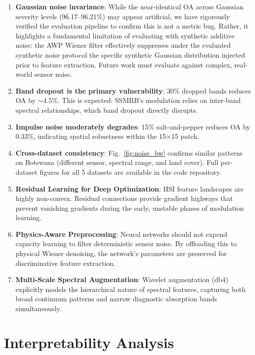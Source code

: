 \documentclass[conference]{IEEEtran}
\begin{document}
{{\begin{enumerate}
\item \textbf{Gaussian noise invariance}: While the near-identical OA across Gaussian severity levels (96.17--96.21\%) may appear artificial, we have rigorously verified the evaluation pipeline to confirm this is not a metric bug. Rather, it highlights a fundamental limitation of evaluating with synthetic additive noise: the AWP Wiener filter effectively suppresses under the evaluated synthetic noise protocol the specific synthetic Gaussian distribution injected prior to feature extraction. Future work must evaluate against complex, real-world sensor noise.
\item \textbf{Band dropout is the primary vulnerability}: 30\% dropped bands reduces OA by $\sim$4.5\%. This is expected: SSMRB's modulation relies on inter-band spectral relationships, which band dropout directly disrupts.
\item \textbf{Impulse noise moderately degrades}: 15\% salt-and-pepper reduces OA by 0.33\%, indicating spatial robustness within the 15$\times$15 patch.
\item \textbf{Cross-dataset consistency}: Fig.~\ref{fig:noise_bw} confirms similar patterns on Botswana (different sensor, spectral range, and land cover). Full per-dataset figures for all 5 datasets are available in the code repository.
    \item \textbf{Residual Learning for Deep Optimization}: HSI feature landscapes are highly non-convex. Residual connections provide gradient highways that prevent vanishing gradients during the early, unstable phases of modulation learning.
    \item \textbf{Physics-Aware Preprocessing}: Neural networks should not expend capacity learning to filter deterministic sensor noise. By offloading this to physical Wiener denoising, the network's parameters are preserved for discriminative feature extraction.
    \item \textbf{Multi-Scale Spectral Augmentation}: Wavelet augmentation (db4) explicitly models the hierarchical nature of spectral features, capturing both broad continuum patterns and narrow diagnostic absorption bands simultaneously.
\end{enumerate}

\section{Interpretability Analysis}

}}
\end{document}
